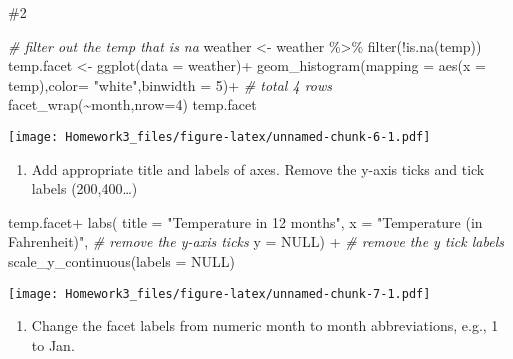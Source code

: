 \documentclass[
]{article}
\newenvironment{Shaded}{\begin{snugshade}}{\end{snugshade}}
\newcommand{\AttributeTok}[1]{\textcolor[rgb]{0.77,0.63,0.00}{#1}}
\newcommand{\CommentTok}[1]{\textcolor[rgb]{0.56,0.35,0.01}{\textit{#1}}}
\newcommand{\ConstantTok}[1]{\textcolor[rgb]{0.00,0.00,0.00}{#1}}
\newcommand{\DecValTok}[1]{\textcolor[rgb]{0.00,0.00,0.81}{#1}}
\newcommand{\FunctionTok}[1]{\textcolor[rgb]{0.00,0.00,0.00}{#1}}
\newcommand{\NormalTok}[1]{#1}
\newcommand{\OtherTok}[1]{\textcolor[rgb]{0.56,0.35,0.01}{#1}}
\newcommand{\SpecialCharTok}[1]{\textcolor[rgb]{0.00,0.00,0.00}{#1}}
\newcommand{\StringTok}[1]{\textcolor[rgb]{0.31,0.60,0.02}{#1}}
\providecommand{\tightlist}{%
  \setlength{\itemsep}{0pt}\setlength{\parskip}{0pt}}
\begin{document}
\#2

\begin{Shaded}
\begin{Highlighting}[]
\CommentTok{\# filter out the temp that is na}
\NormalTok{weather }\OtherTok{\textless{}{-}}\NormalTok{ weather }\SpecialCharTok{\%\textgreater{}\%} \FunctionTok{filter}\NormalTok{(}\SpecialCharTok{!}\FunctionTok{is.na}\NormalTok{(temp))}
\NormalTok{temp.facet }\OtherTok{\textless{}{-}} \FunctionTok{ggplot}\NormalTok{(}\AttributeTok{data =}\NormalTok{ weather)}\SpecialCharTok{+}
  \FunctionTok{geom\_histogram}\NormalTok{(}\AttributeTok{mapping =} \FunctionTok{aes}\NormalTok{(}\AttributeTok{x =}\NormalTok{ temp),}\AttributeTok{color=} \StringTok{"white"}\NormalTok{,}\AttributeTok{binwidth =} \DecValTok{5}\NormalTok{)}\SpecialCharTok{+}
  \CommentTok{\# total 4 rows}
  \FunctionTok{facet\_wrap}\NormalTok{(}\SpecialCharTok{\textasciitilde{}}\NormalTok{month,}\AttributeTok{nrow=}\DecValTok{4}\NormalTok{)}
\NormalTok{temp.facet}
\end{Highlighting}
\end{Shaded}

\texttt{[image: Homework3\_files/figure-latex/unnamed-chunk-6-1.pdf]}

\begin{enumerate}
\def\labelenumi{\alph{enumi}.}
\tightlist
\item
  Add appropriate title and labels of axes. Remove the y-axis ticks and
  tick labels (200,400\ldots)
\end{enumerate}

\begin{Shaded}
\begin{Highlighting}[]
\NormalTok{temp.facet}\SpecialCharTok{+} \FunctionTok{labs}\NormalTok{(}
  \AttributeTok{title =} \StringTok{"Temperature in 12 months"}\NormalTok{,}
  \AttributeTok{x =} \StringTok{"Temperature (in Fahrenheit)"}\NormalTok{,}
  \CommentTok{\# remove the y{-}axis ticks}
  \AttributeTok{y =} \ConstantTok{NULL}\NormalTok{) }\SpecialCharTok{+} 
  \CommentTok{\# remove the y tick labels}
  \FunctionTok{scale\_y\_continuous}\NormalTok{(}\AttributeTok{labels =} \ConstantTok{NULL}\NormalTok{)}
\end{Highlighting}
\end{Shaded}

\texttt{[image: Homework3\_files/figure-latex/unnamed-chunk-7-1.pdf]}

\begin{enumerate}
\def\labelenumi{\alph{enumi}.}
\setcounter{enumi}{1}
\tightlist
\item
  Change the facet labels from numeric month to month abbreviations,
  e.g., 1 to Jan.
\end{enumerate}
\end{document}
